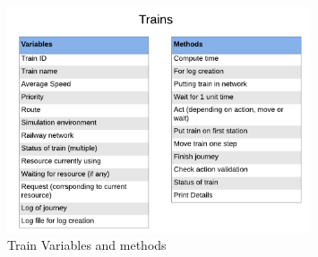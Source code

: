 \begin{figure}[h]
    \centering
    \includegraphics[width=0.8\textwidth]{train}
    \caption{ Train Variables and methods }
    \label{image-myimage3}
\end{figure}

